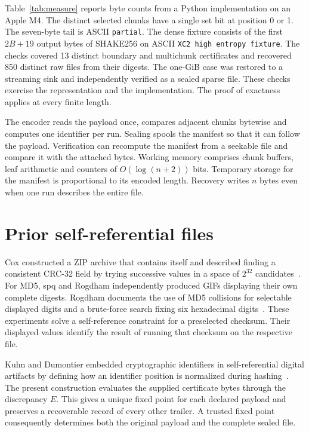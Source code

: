\documentclass[10pt,twocolumn,letterpaper]{article}
\begin{document}
Table~\ref{tab:measure} reports byte counts from a Python implementation on an Apple M4. The distinct selected chunks have a single set bit at position 0 or 1. The seven-byte tail is ASCII \texttt{partial}. The dense fixture consists of the first \(2B+19\) output bytes of SHAKE256 on ASCII \texttt{XC2 high entropy fixture}. The checks covered 13 distinct boundary and multichunk certificates and recovered 850 distinct raw files from their digests. The one-GiB case was restored to a streaming sink and independently verified as a sealed sparse file. These checks exercise the representation and the implementation. The proof of exactness applies at every finite length.

The encoder reads the payload once, compares adjacent chunks bytewise and computes one identifier per run. Sealing spools the manifest so that it can follow the payload. Verification can recompute the manifest from a seekable file and compare it with the attached bytes. Working memory comprises chunk buffers, leaf arithmetic and counters of \(O(\log(n+2))\) bits. Temporary storage for the manifest is proportional to its encoded length. Recovery writes \(n\) bytes even when one run describes the entire file.

\section{Prior self-referential files}
Cox constructed a ZIP archive that contains itself and described finding a consistent CRC-32 field by trying successive values in a space of \(2^{32}\) candidates~\cite{cox}. For MD5, spq and Rogdham independently produced GIFs displaying their own complete digests. Rogdham documents the use of MD5 collisions for selectable displayed digits and a brute-force search fixing six hexadecimal digits~\cite{rog}. These experiments solve a self-reference constraint for a preselected checksum. Their displayed values identify the result of running that checksum on the respective file.

Kuhn and Dumontier embedded cryptographic identifiers in self-referential digital artifacts by defining how an identifier position is normalized during hashing~\cite{trusty}. The present construction evaluates the supplied certificate bytes through the discrepancy \(E\). This gives a unique fixed point for each declared payload and preserves a recoverable record of every other trailer. A trusted fixed point consequently determines both the original payload and the complete sealed file.
\end{document}
